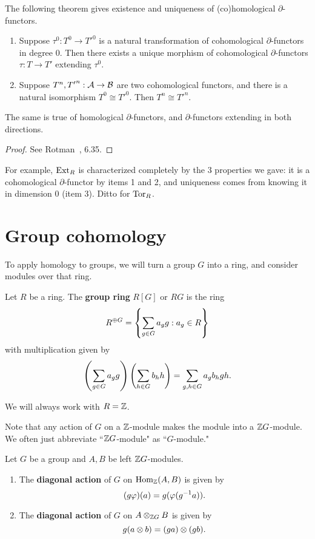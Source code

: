 The following theorem gives existence and uniqueness of (co)homological $\partial$-functors.
\begin{thm}
\begin{enumerate}
\item
Suppose $\tau^0:T^0\to {T'}^0$ is a natural transformation of cohomological $\partial$-functors in degree 0. Then there exists a unique morphism of cohomological $\partial$-functors $\tau:T\to T'$ extending $\tau^0$.
\item
Suppose $T^n,{T'}^n:\cal A\to \cal B$ are two cohomological functors, and there is a natural isomorphism $T^0\cong {T'}^0$. Then $T^n\cong {T'}^n$.
\end{enumerate}
The same is true of homological $\partial$-functors, and $\partial$-functors extending in both directions.
\end{thm} 
\begin{proof}
See Rotman~\cite{Ro09}, 6.35.
\end{proof}
For example, $\Ext_R$ is characterized completely by the 3 properties we gave: it is a cohomological $\partial$-functor by items 1 and 2, and uniqueness comes from knowing it in dimension 0 (item 3). Ditto for $\Tor_R$.
\section{Group cohomology}
To apply homology to groups, we will turn a group $G$ into a ring, and consider modules over that ring.
\begin{df}
Let $R$ be a ring. 
The \textbf{group ring} $R[G]$ or $RG$ is the ring 
\[R^{\opl G}=\set{\sum_{g\in G} a_gg}{a_g\in R}\]
with multiplication given by
\[
\pa{\sum_{g\in G} a_gg}\pa{\sum_{h\in G} b_hh}=\sum_{g,h\in G} a_gb_hgh.
\]
\end{df}
We will always work with $R=\Z$.

Note that any action of $G$ on a $\Z$-module makes the module into a $\Z G$-module. We often just abbreviate ``$\Z G$-module" as ``$G$-module."
\begin{df}
Let $G$ be a group and $A,B$ be left $\Z G$-modules.
\begin{enumerate}
\item %
The \textbf{diagonal action} of $G$ on $\Hom_{\Z}(A,B)$ is given by
\[
(g\ph)(a)=g(\ph(g^{-1}a)).
\]
\item %
The \textbf{diagonal action} of $G$ on $A\ot_{\Z G} B$ is given by
\[
g(a\ot b)=(ga)\ot (gb).
\]
\end{enumerate}
\end{df}

